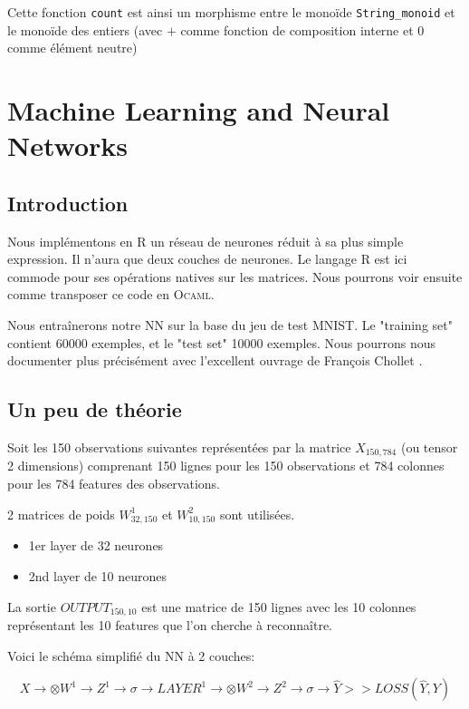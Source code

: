 Cette fonction \verb+count+ est ainsi un morphisme entre le monoïde \verb+String_monoid+ et 
le monoïde des entiers (avec $+$ comme fonction de composition interne et $0$
comme élément neutre)
\section{Machine Learning and Neural Networks}

\subsection{Introduction}

Nous implémentons en R un réseau de neurones réduit à sa plus simple expression.
Il n'aura que deux couches de neurones.
Le langage R est ici commode pour ses opérations natives sur les matrices.
Nous pourrons voir ensuite comme transposer ce code en \textsc{Ocaml}.

Nous entraînerons notre NN sur la base du jeu de test MNIST.
Le  "training set" contient 60000 exemples, et le "test set" 10000 exemples.
Nous pourrons nous documenter plus précisément avec l'excellent ouvrage de François Chollet \cite{deepR}.

\subsection{Un peu de théorie}

Soit les 150 observations suivantes représentées par la matrice $X_{150,784}$ (ou tensor 2 dimensions) comprenant 150 lignes pour les 150 observations et 784 colonnes pour les 784 features des observations.

2 matrices de poids $W^1_{32,150}$ et $W^2_{10,150}$ sont utilisées.

\begin{itemize}
	\item 1er layer de 32 neurones
	\item 2nd layer de 10 neurones
\end{itemize}

La sortie $OUTPUT_{150,10}$ est une matrice de 150 lignes avec les 10 colonnes représentant 
les 10 features que l'on cherche à reconnaître.

Voici le schéma simplifié du NN à 2 couches:

$$
X \longrightarrow \otimes W^1 \rightarrow  Z^1 \rightarrow \sigma \rightarrow LAYER^1 \longrightarrow
\otimes W^2 
\rightarrow Z^2 
\rightarrow 
\sigma 
\rightarrow \hat{Y} 
>> LOSS(\hat{Y}, Y)
$$

